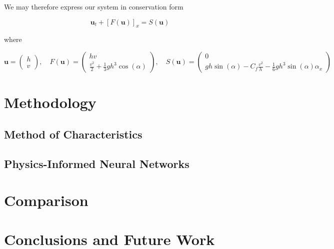 \documentclass[letterpaper,11pt]{article}
\begin{document}
    \pagebreak
    We may therefore express our system in conservation form

    $$
        \textbf{u}_t + \left[ F(\textbf{u}) \right]_x = S(\textbf{u})
    $$

    where

    $$
    \textbf{u} = \begin{pmatrix}
        h \\
        v
    \end{pmatrix}, \quad F(\textbf{u}) = \begin{pmatrix}
        hv \\
        \frac{v^2}{2} + \frac{1}{3} g h^3 \cos{(\alpha)}
    \end{pmatrix}, \quad S(\textbf{u}) = \begin{pmatrix}
        0 \\
        g h \sin{(\alpha)} - C_f \frac{v^2}{h} - \frac{1}{6} g h^3 \sin{(\alpha)} \alpha_x
    \end{pmatrix}
    $$

    \section{Methodology}\label{sec:proposed-methodology}
    \subsection{Method of Characteristics}\label{subset:moc-methodology}

    \subsection{Physics-Informed Neural Networks}\label{subsec:pinn-methodology}

    \section{Comparison}\label{sec:comparison}

    \section{Conclusions and Future Work}\label{sec:conclusion}

    \pagebreak

    
    
\end{document}
